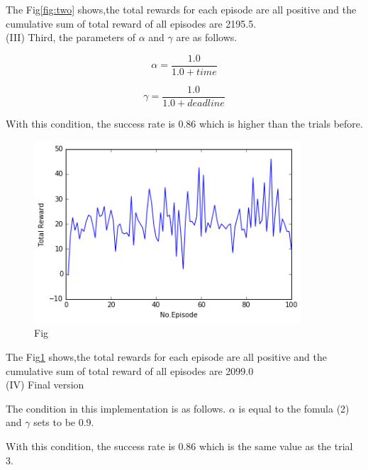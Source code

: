 \documentclass[a4paper,11pt]{article}
\begin{document}
The Fig\ref{fig:two} shows,the total rewards for each episode are all positive and the cumulative sum of total reward of all episodes are 2195.5.
\\


(I\hspace{-.1em}I\hspace{-.1em}I) Third, the parameters of $\alpha$ and $\gamma$ are as follows.

\begin{equation}
	\alpha=\frac{1.0}{1.0+time}
\end{equation}

\begin{equation}
	\gamma=\frac{1.0}{1.0+deadline}
\end{equation}

With this condition, the success rate is 0.86 which is higher than the trials before.


\begin{figure}[H]
\begin{center}
\includegraphics[width=100mm]{graph/better.jpg}
\end{center}
\caption{Fig}
\label{fig:three}
\end{figure}

The Fig\ref{fig:three} shows,the total rewards for each episode are all positive and the cumulative sum of total reward of all episodes are 2099.0
\\

(I\hspace{-.1em}V) Final version

The condition in this implementation is as follows.
$\alpha$ is equal to the fomula (2) and $\gamma$ sets to be 0.9.

With this condition, the success rate is 0.86 which is the same value as the trial 3.
\end{document}
